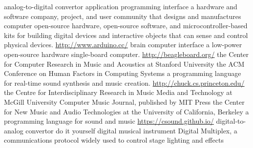  analog-to-digital convertor
 application programming interface 
 a hardware and software company, project, and user community that designs and manufactures computer open-source hardware, open-source software, and microcontroller-based kits for building digital devices and interactive objects that can sense and control physical devices. \url{http://www.arduino.cc/}
 brain computer interface
 a low-power open-source hardware single-board computer.   \url{http://beagleboard.org/}
 the Center for Computer Research in Music and Acoustics at Stanford University %
 the ACM Conference on Human Factors in Computing Systems %
 a programming language for real-time sound synthesis and music creation.  \url{http://chuck.cs.princeton.edu/}
 the Centre for Interdisciplinary Research in Music Media and Technology at McGill University %
 Computer Music Journal, published by MIT Press %
 the Center for New Music and Audio Technologies at the University of California, Berkeley %
 a programming language for sound and music  \url{https://csound.github.io/}
 digital-to-analog convertor
 do it yourself
 digital musical instrument
 Digital Multiplex, a communications protocol widely used to control stage lighting and effects
